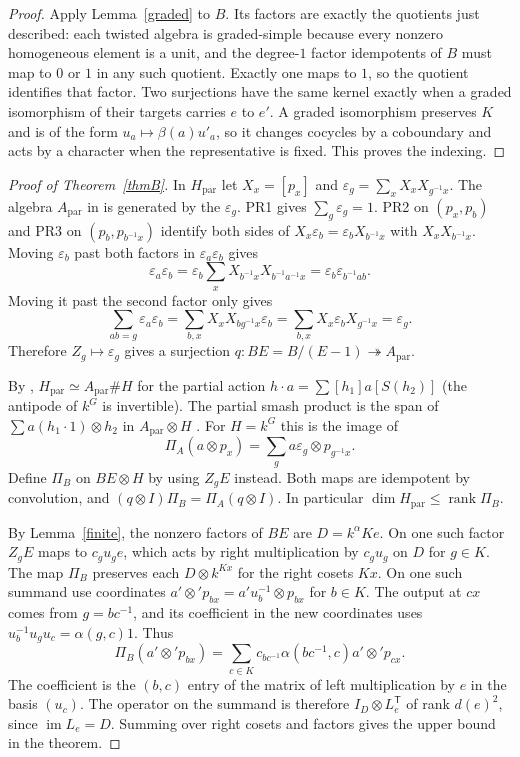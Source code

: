 \documentclass[11pt]{amsart}
\theoremstyle{definition}
\newcommand{\paralg}{H_{\mathrm{par}}}
\newcommand{\Apar}{A_{\mathrm{par}}}
\newcommand{\im}{\operatorname{im}}
\newcommand{\rank}{\operatorname{rank}}
\begin{document}
\begin{proof}
Apply Lemma~\ref{graded} to $B$. Its factors are exactly the quotients just described: each twisted algebra is graded-simple because every nonzero homogeneous element is a unit, and the degree-$1$ factor idempotents of $B$ must map to $0$ or $1$ in any such quotient. Exactly one maps to $1$, so the quotient identifies that factor. Two surjections have the same kernel exactly when a graded isomorphism of their targets carries $e$ to $e'$. A graded isomorphism preserves $K$ and is of the form $u_a\mapsto\beta(a)u'_a$, so it changes cocycles by a coboundary and acts by a character when the representative is fixed. This proves the indexing.
\end{proof}

\begin{proof}[Proof of Theorem~\ref{thmB}]
In $\paralg$ let $X_x=[p_x]$ and $\varepsilon_g=\sum_x X_xX_{g^{-1}x}$. The algebra $\Apar$ in \cite{ABV15} is generated by the $\varepsilon_g$. PR1 gives $\sum_g\varepsilon_g=1$. PR2 on $(p_x,p_b)$ and PR3 on $(p_b,p_{b^{-1}x})$ identify both sides of $X_x\varepsilon_b=\varepsilon_b X_{b^{-1}x}$ with $X_xX_{b^{-1}x}$. Moving $\varepsilon_b$ past both factors in $\varepsilon_a\varepsilon_b$ gives
\[
 \varepsilon_a\varepsilon_b
 =\varepsilon_b\sum_x X_{b^{-1}x}X_{b^{-1}a^{-1}x}
 =\varepsilon_b\varepsilon_{b^{-1}ab}.
\]
Moving it past the second factor only gives
\[
 \sum_{ab=g}\varepsilon_a\varepsilon_b
 =\sum_{b,x}X_xX_{bg^{-1}x}\varepsilon_b
 =\sum_{b,x}X_x\varepsilon_bX_{g^{-1}x}=\varepsilon_g.
\]
Therefore $Z_g\mapsto\varepsilon_g$ gives a surjection $q:BE=B/(E-1)\twoheadrightarrow\Apar$.

By \cite[Theorem~4.8]{ABV15}, $\paralg\simeq\Apar\# H$ for the partial action $h\cdot a=\sum[h_1]a[S(h_2)]$ (the antipode of $k^G$ is invertible). The partial smash product is the span of $\sum a(h_1\cdot1)\otimes h_2$ in $\Apar\otimes H$ \cite[\S3, before Lemma~3.6]{ABV15}. For $H=k^G$ this is the image of
\[
 \Pi_A(a\otimes p_x)=\sum_g a\varepsilon_g\otimes p_{g^{-1}x}.
\]
Define $\Pi_B$ on $BE\otimes H$ by using $Z_gE$ instead. Both maps are idempotent by convolution, and $(q\otimes I)\Pi_B=\Pi_A(q\otimes I)$. In particular $\dim\paralg\le\rank\Pi_B$.

By Lemma~\ref{finite}, the nonzero factors of $BE$ are $D=k^\alpha K e$. On one such factor $Z_gE$ maps to $c_gu_ge$, which acts by right multiplication by $c_gu_g$ on $D$ for $g\in K$. The map $\Pi_B$ preserves each $D\otimes k^{Kx}$ for the right cosets $Kx$. On one such summand use coordinates $a'\otimes' p_{bx}=a'u_b^{-1}\otimes p_{bx}$ for $b\in K$. The output at $cx$ comes from $g=bc^{-1}$, and its coefficient in the new coordinates uses $u_b^{-1}u_g u_c=\alpha(g,c)1$. Thus
\[
 \Pi_B(a'\otimes' p_{bx})=
 \sum_{c\in K}c_{bc^{-1}}\alpha(bc^{-1},c)a'\otimes' p_{cx}.
\]
The coefficient is the $(b,c)$ entry of the matrix of left multiplication by $e$ in the basis $(u_c)$. The operator on the summand is therefore $I_D\otimes L_e^{\mathsf T}$ of rank $d(e)^2$, since $\im L_e=D$. Summing over right cosets and factors gives the upper bound in the theorem.


\end{proof}
\end{document}
